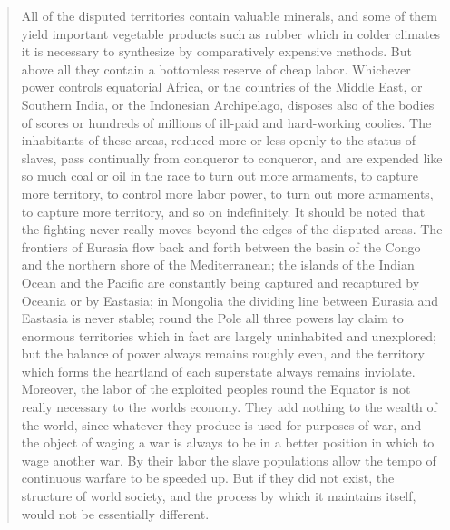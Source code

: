 \begin{quotation}
All of the disputed territories contain valuable minerals, and some of
them yield important vegetable products such as rubber which in colder
climates it is necessary to synthesize by comparatively expensive
methods. But above all they contain a bottomless reserve of cheap labor.
Whichever power controls equatorial Africa, or the countries of the
Middle East, or Southern India, or the Indonesian Archipelago, disposes
also of the bodies of scores or hundreds of millions of ill-paid and
hard-working coolies. The inhabitants of these areas, reduced more or
less openly to the status of slaves, pass continually from conqueror to
conqueror, and are expended like so much coal or oil in the race to turn
out more armaments, to capture more territory, to control more labor
power, to turn out more armaments, to capture more territory, and so on
indefinitely. It should be noted that the fighting never really moves
beyond the edges of the disputed areas. The frontiers of Eurasia flow
back and forth between the basin of the Congo and the northern shore of
the Mediterranean; the islands of the Indian Ocean and the Pacific are
constantly being captured and recaptured by Oceania or by Eastasia; in
Mongolia the dividing line between Eurasia and Eastasia is never stable;
round the Pole all three powers lay claim to enormous territories which
in fact are largely uninhabited and unexplored; but the balance of power
always remains roughly even, and the territory which forms the heartland
of each superstate always remains inviolate. Moreover, the labor of the
exploited peoples round the Equator is not really necessary to the
world\textquotesingle s economy. They add nothing to the wealth of the
world, since whatever they produce is used for purposes of war, and the
object of waging a war is always to be in a better position in which to
wage another war. By their labor the slave populations allow the tempo
of continuous warfare to be speeded up. But if they did not exist, the
structure of world society, and the process by which it maintains
itself, would not be essentially different.


\end{quotation}
